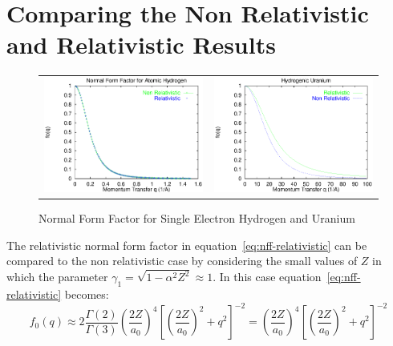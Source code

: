 
\section{Comparing the Non Relativistic and Relativistic Results}
    \begin{figure}[h]
    \begin{center}
    \begin{tabular}{cc}
        \includegraphics[width=7.0cm]{f0_hydrogen.eps}
        &
        \includegraphics[width=7.0cm]{f0_uranium.eps}
    \end{tabular}
    \caption{Normal Form Factor for Single Electron Hydrogen and Uranium}
    \label{fig:hydrogen-uranium}
    \end{center}
    \end{figure}
    The relativistic normal form factor in equation~\ref{eq:nff-relativistic}
    can be compared to the non relativistic case by considering the small values
    of $Z$ in which the parameter $\gamma_1 = \sqrt{1-\alpha^2Z^2} \approx 1$. 
    In this case equation~\ref{eq:nff-relativistic} becomes:
    \begin{equation} \label{eq:reduction}
        f_0(q) \approx 
        2 \frac{\Gamma(2)}{\Gamma(3)}
        \left( \frac{2Z}{a_0} \right)^4
        \left[ 
            \left( \frac{2Z}{a_0} \right)^2 + q^2
        \right]^{-2} 
        =
        \left( \frac{2Z}{a_0} \right)^4
        \left[ 
            \left( \frac{2Z}{a_0} \right)^2 + q^2
        \right]^{-2} 
    \end{equation}

